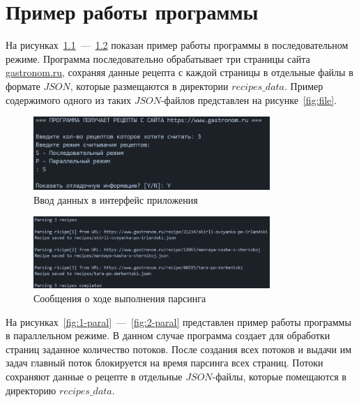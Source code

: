 \chapter{Пример работы программы}

На рисунках~\ref{fig:1-seq}~---~\ref{fig:2-seq} показан пример работы программы в последовательном режиме. Программа последовательно обрабатывает три страницы сайта \url{gastronom.ru}, сохраняя данные рецепта с каждой страницы в отдельные файлы в формате $JSON$, которые размещаются в директории $recipes\_data$. Пример содержимого одного из таких $JSON$-файлов представлен на рисунке~\ref{fig:file}.

\begin{figure}[h]
	\centering
	\includegraphics[width=0.8\textwidth]{images/examples/sin.png}
	\caption{Ввод данных в интерфейс приложения}
	\label{fig:1-seq}
\end{figure}
\begin{figure}[h]
	\centering
	\includegraphics[width=0.8\textwidth]{images/examples/sout.png}
	\caption{Сообщения о ходе выполнения парсинга}
	\label{fig:2-seq}
\end{figure}


На рисунках~\ref{fig:1-paral}~---~\ref{fig:2-paral} представлен пример работы программы в параллельном режиме. В данном случае программа создает для обработки страниц заданное  количество потоков. После создания всех потоков и выдачи им задач главный поток блокируется на время парсинга всех страниц. Потоки сохраняют данные о рецепте в отдельные $JSON$-файлы, которые помещаются в директорию $recipes\_data$.

